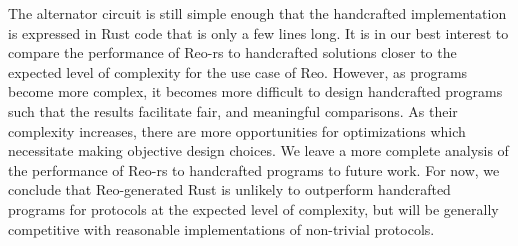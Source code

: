 The alternator circuit is still simple enough that the handcrafted implementation is expressed in Rust code that is only a few lines long. It is in our best interest to compare the performance of Reo-rs to handcrafted solutions closer to the expected level of complexity for the use case of Reo. However, as programs become more complex, it becomes more difficult to design handcrafted programs such that the results facilitate fair, and meaningful comparisons. As their complexity increases, there are more opportunities for optimizations which necessitate making objective design choices. We leave a more complete analysis of the performance of Reo-rs to handcrafted programs to future work. For now, we conclude that Reo-generated Rust is unlikely to outperform handcrafted programs for protocols at the expected level of complexity, but will be generally competitive with reasonable implementations of non-trivial protocols.


